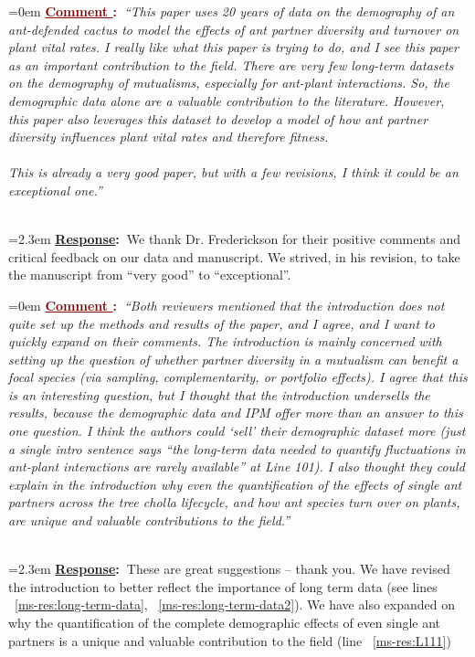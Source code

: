 \documentclass[12pt]{article}
\newcounter{cN}
\newcommand{\comment}[1]{
	\vspace{2em}
	\refstepcounter{cN} %
	\noindent \hangindent=0em \textbf{\textcolor{Maroon}{\uline{Comment \thecN}:~}}\emph{``#1''}
	}
\newcommand{\response}[1]{
	\\[0.25em]
	\hangindent=2.3em \textbf{\textcolor{NavyBlue}{\uline{Response}:~}}#1
	}
\begin{document}
\comment{This paper uses 20 years of data on the demography of an ant-defended cactus to model the effects of ant partner diversity and turnover on plant vital rates. I really like what this paper is trying to do, and I see this paper as an important contribution to the field. There are very few long-term datasets on the demography of mutualisms, especially for ant-plant interactions. So, the demographic data alone are a valuable contribution to the literature. However, this paper also leverages this dataset to develop a model of how ant partner diversity influences plant vital rates and therefore fitness.
\\
\\	
This is already a very good paper, but with a few revisions, I think it could be an exceptional one.}
\response{We thank Dr. Frederickson for their positive comments and critical feedback on our data and manuscript. We strived, in his revision, to take the manuscript from ``very good'' to ``exceptional''.}

\comment{Both reviewers mentioned that the introduction does not quite set up the methods and results of the paper, and I agree, and I want to quickly expand on their comments. 
The introduction is mainly concerned with setting up the question of whether partner diversity in a mutualism can benefit a focal species (via sampling, complementarity, or portfolio effects). 
I agree that this is an interesting question, but I thought that the introduction undersells the results, because the demographic data and IPM offer more than an answer to this one question. 
I think the authors could ‘sell’ their demographic dataset more (just a single intro sentence says “the long-term data needed to quantify fluctuations in ant-plant interactions are rarely available” at Line 101). 
I also thought they could explain in the introduction why even the quantification of the effects of single ant partners across the tree cholla lifecycle, and how ant species turn over on plants, are unique and valuable contributions to the field.}
\response{These are great suggestions -- thank you. We have revised the introduction to better reflect the importance of long term data (see lines ~\ref{ms-res:long-term-data}, ~\ref{ms-res:long-term-data2}). 
We have also expanded on why the quantification of the complete demographic effects of even single ant partners is a unique and valuable contribution to the field (line ~\ref{ms-res:L111})
}
\end{document}
